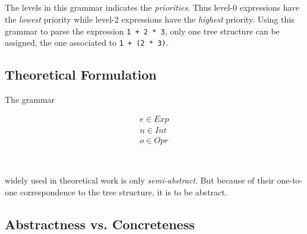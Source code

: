 \documentclass[a4paper,12pt]{article}
\begin{document}
\begin{grammar}
 \\
 \\
 \\
 \\
\end{grammar}
\noindent
The levels in this grammar indicates the \emph{priorities}.  Thus level-0 expressions
have the \emph{lowest} priority while level-2 expressions have the \emph{highest}
priority.  Using this grammar to parse the expression \verb|1 + 2 * 3|, only one tree
structure can be assigned, the one associated to \verb|1 + (2 * 3)|.

\subsection{Theoretical Formulation}

The grammar

\begin{gather*}
 e \in Exp \\
 n \in Int \\
 o \in Opr
\end{gather*}

\begin{grammar}
 \\
\end{grammar}

\noindent
widely used in theoretical work is only \emph{semi-abstract}.  But because of their
one-to-one correspondence to the tree structure, it is  to be abstract.

\subsection{Abstractness vs. Concreteness}
\end{document}
